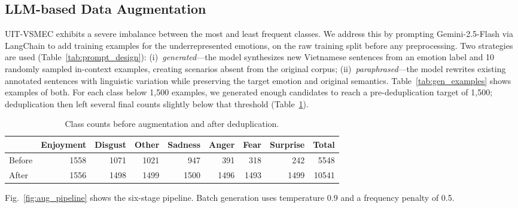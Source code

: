 \documentclass[conference]{IEEEtran}
\begin{document}
\subsection{LLM-based Data Augmentation}
UIT-VSMEC exhibits a severe imbalance between the most and least frequent classes. We address this by prompting Gemini-2.5-Flash \cite{comanici2025gemini} via LangChain \cite{Chase_LangChain_2022} to add training examples for the underrepresented emotions, on the raw training split before any preprocessing. Two strategies are used (Table~\ref{tab:prompt_design}): (i)~\textit{generated}---the model synthesizes new Vietnamese sentences from an emotion label and 10 randomly sampled in-context examples, creating scenarios absent from the original corpus; (ii)~\textit{paraphrased}---the model rewrites existing annotated sentences with linguistic variation while preserving the target emotion and original semantics. Table~\ref{tab:gen_examples} shows examples of both. For each class below 1,500 examples, we generated enough candidates to reach a pre-deduplication target of 1,500; deduplication then left several final counts slightly below that threshold (Table~\ref{tab:class-counts}).
\begin{table}[H]
\centering
\caption{Class counts before augmentation and after deduplication.}
\label{tab:class-counts}
\footnotesize
\setlength{\tabcolsep}{2.5pt}
\begin{tabular}{@{}lrrrrrrrr@{}}
\toprule
 & Enjoyment & Disgust & Other & Sadness & Anger & Fear & Surprise & Total \\
\midrule
Before & 1558 & 1071 & 1021 & 947 & 391 & 318 & 242 & 5548 \\
After  & 1556 & 1498 & 1499 & 1500 & 1496 & 1493 & 1499 & 10541 \\
\bottomrule
\end{tabular}
\end{table}
Fig.~\ref{fig:aug_pipeline} shows the six-stage pipeline.
Batch generation uses temperature 0.9 \cite{li2025temperature} and a frequency penalty of 0.5.
\end{document}
